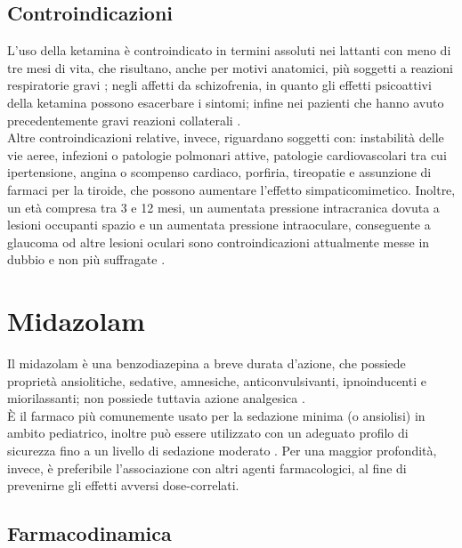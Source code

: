 \subsection*{Controindicazioni}

L'uso della ketamina è controindicato in termini assoluti nei lattanti con meno di tre mesi di vita, che risultano, anche per motivi anatomici, più soggetti a reazioni respiratorie gravi \cite{Zanos2018}; negli affetti da schizofrenia, in quanto gli effetti psicoattivi della ketamina possono esacerbare i sintomi; infine nei pazienti che hanno avuto precedentemente gravi reazioni collaterali \cite{Uptodatepharmacology}.
\\Altre controindicazioni relative, invece, riguardano soggetti con: instabilità delle vie aeree, infezioni o patologie polmonari attive, patologie cardiovascolari tra cui ipertensione, angina o scompenso cardiaco, porfiria, tireopatie e assunzione di farmaci per la tiroide, che possono aumentare l'effetto simpaticomimetico. Inoltre, un età compresa tra 3 e 12 mesi, un aumentata pressione intracranica dovuta a lesioni occupanti spazio e un aumentata pressione intraoculare, conseguente a glaucoma od altre lesioni oculari sono controindicazioni attualmente messe in dubbio e non più suffragate \cite{Green2011, Simeupsedazione}.   

\section{Midazolam}

Il midazolam è una benzodiazepina a breve durata d'azione, che possiede proprietà ansiolitiche, sedative, amnesiche, anticonvulsivanti, ipnoinducenti e miorilassanti; non possiede tuttavia azione analgesica \cite{Krauss2006}. 
\\ \`E il farmaco più comunemente usato per la sedazione minima (o ansiolisi) in ambito pediatrico, inoltre può essere utilizzato con un adeguato profilo di sicurezza fino a un livello di sedazione moderato \cite{Manso2019}. Per una maggior profondità, invece, è preferibile l'associazione con altri agenti farmacologici, al fine di prevenirne gli effetti avversi dose-correlati.

\subsection{Farmacodinamica}

